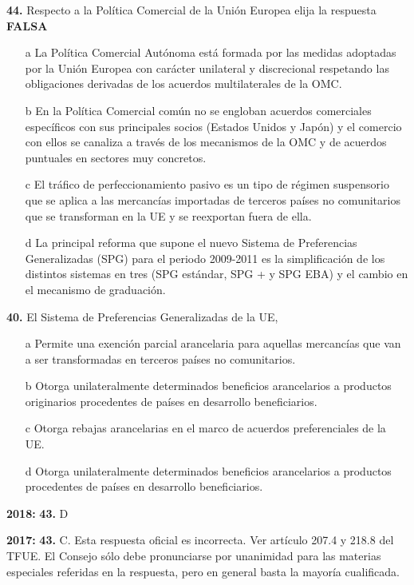 \documentclass{nuevotema}
\begin{document}
\textbf{44.} Respecto a la Política Comercial de la Unión Europea elija la respuesta \textbf{FALSA}
\begin{itemize}
	\item[a] La Política Comercial Autónoma está formada por las medidas adoptadas por la Unión Europea con carácter unilateral y discrecional respetando las obligaciones derivadas de los acuerdos multilaterales de la OMC.
	\item[b] En la Política Comercial común no se engloban acuerdos comerciales específicos con sus principales socios (Estados Unidos y Japón) y el comercio con ellos se canaliza a través de los mecanismos de la OMC y de acuerdos puntuales en sectores muy concretos.
	\item[c] El tráfico de perfeccionamiento pasivo es un tipo de régimen suspensorio que se aplica a las mercancías importadas de terceros países no comunitarios que se transforman en la UE y se reexportan fuera de ella.
	\item[d] La principal reforma que supone el nuevo Sistema de Preferencias Generalizadas (SPG) para el periodo 2009-2011 es la simplificación de los distintos sistemas en tres (SPG estándar, SPG + y SPG EBA) y el cambio en el mecanismo de graduación.
\end{itemize}

\textbf{40.} El Sistema de Preferencias Generalizadas de la UE,
\begin{itemize}
	\item[a] Permite una exención parcial arancelaria para aquellas mercancías que van a ser transformadas en terceros países no comunitarios.
	\item[b] Otorga unilateralmente determinados beneficios arancelarios a productos originarios procedentes de países en desarrollo beneficiarios.
	\item[c] Otorga rebajas arancelarias en el marco de acuerdos preferenciales de la UE.
	\item[d] Otorga unilateralmente determinados beneficios arancelarios a productos procedentes de países en desarrollo beneficiarios.
\end{itemize}

\notas

\textbf{2018:} \textbf{43.} D

\textbf{2017:} \textbf{43.} C. Esta respuesta oficial es incorrecta. Ver artículo 207.4 y 218.8 del TFUE. El Consejo sólo debe pronunciarse por unanimidad para las materias especiales referidas en la respuesta, pero en general basta la mayoría cualificada.
\end{document}
